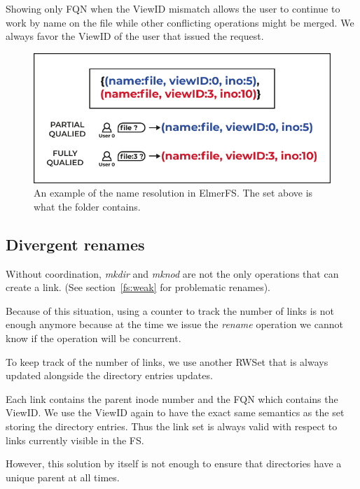 \documentclass[sigconf,anonymous,10pt]{acmart}
\begin{document}
Showing only FQN when the ViewID mismatch allows the user to continue to
work by name on the file while other conflicting operations might be merged.
We always favor the ViewID of the user that issued the request.


\begin{figure}[h]
	\caption{An example of the name resolution in ElmerFS. The set above is
	         what the folder contains.}
	\centering
	\includegraphics[scale=0.6]{Le-bonhomme-sait-pas-ce-quil-veut.pdf}
\end{figure}


\subsection{Divergent renames}

Without coordination, \textit{mkdir} and \textit{mknod} are not the only
operations that can create a link. (See section~\ref{fs:weak} for problematic
renames).

Because of this situation, using a counter to track the number of links is not
enough anymore because at the time we issue the \textit{rename} operation
we cannot know if the operation will be concurrent.

To keep track of the number of links, we use another RWSet that is
always updated alongside the directory entries updates.

Each link contains the parent inode number and the FQN which contains
the ViewID.
We use the ViewID again to have the exact same semantics as the set storing
the directory entries. Thus the link set is always valid with respect to
links currently visible in the FS.

However, this solution by itself is not enough to ensure that directories have a
unique parent at all times.
\end{document}

